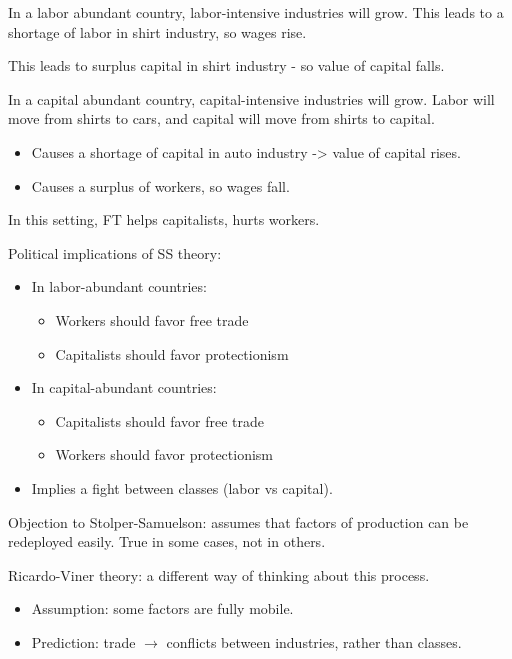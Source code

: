 \documentclass{article}
\begin{document}
In a labor abundant country, labor-intensive industries will grow.  This leads to a shortage of labor in shirt industry, so wages rise.

This leads to surplus capital in shirt industry - so value of capital falls.

In a capital abundant country, capital-intensive industries will grow.  Labor will move from shirts to cars, and capital will move from shirts to capital.

\begin{itemize}
  \item Causes a shortage of capital in auto industry -> value of capital rises.
  \item Causes a surplus of workers, so wages fall.
\end{itemize}

In this setting, FT helps capitalists, hurts workers.

Political implications of SS theory:

\begin{itemize}
  \item In labor-abundant countries:
    \begin{itemize}
      \item Workers should favor free trade
      \item Capitalists should favor protectionism
    \end{itemize}
  \item In capital-abundant countries:
    \begin{itemize}
      \item Capitalists should favor free trade
      \item Workers should favor protectionism
    \end{itemize}
  \item Implies a fight between classes (labor vs capital).
\end{itemize}

Objection to Stolper-Samuelson: assumes that factors of production can be redeployed easily.  True in some cases, not in others.

Ricardo-Viner theory: a different way of thinking about this process.

\begin{itemize}
  \item Assumption: some factors are fully mobile.
  \item Prediction: trade $\to$ conflicts between industries, rather than classes.
\end{itemize}
\end{document}
